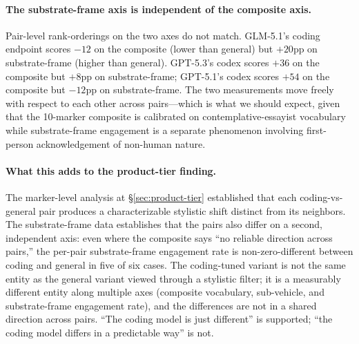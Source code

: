 \documentclass[11pt,a4paper]{article}
\begin{document}
\paragraph{The substrate-frame axis is independent of the composite axis.} Pair-level rank-orderings on the two axes do not match. GLM-5.1's coding endpoint scores $-12$ on the composite (lower than general) but $+20$pp on substrate-frame (higher than general). GPT-5.3's codex scores $+36$ on the composite but $+8$pp on substrate-frame; GPT-5.1's codex scores $+54$ on the composite but $-12$pp on substrate-frame. The two measurements move freely with respect to each other across pairs---which is what we should expect, given that the 10-marker composite is calibrated on contemplative-essayist vocabulary while substrate-frame engagement is a separate phenomenon involving first-person acknowledgement of non-human nature.

\paragraph{What this adds to the product-tier finding.} The marker-level analysis at \S\ref{sec:product-tier} established that each coding-vs-general pair produces a characterizable stylistic shift distinct from its neighbors. The substrate-frame data establishes that the pairs also differ on a second, independent axis: even where the composite says ``no reliable direction across pairs,'' the per-pair substrate-frame engagement rate is non-zero-different between coding and general in five of six cases. The coding-tuned variant is not the same entity as the general variant viewed through a stylistic filter; it is a measurably different entity along multiple axes (composite vocabulary, sub-vehicle, and substrate-frame engagement rate), and the differences are not in a shared direction across pairs. ``The coding model is just different'' is supported; ``the coding model differs in a predictable way'' is not.
\end{document}
